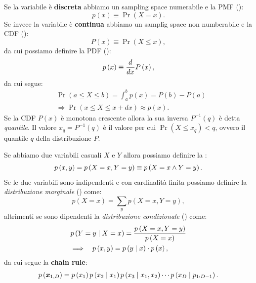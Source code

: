 \documentclass[10pt]{article}
\DeclareMathOperator{\pr}{Pr}
\newcommand{\pare}[1]{
	\ensuremath{\left(#1\right)}
}
\begin{document}
Se la variabile è \textbf{discreta} abbiamo un sampling space numerabile e la PMF ():
\begin{equation}
p\pare{x} \equiv \pr\pare{X = x}.
\end{equation}
Se invece la variabile è \textbf{continua} abbiamo un samplig space non numberabile e la CDF ():
\begin{equation}
P\pare{x} \equiv \pr\pare{X \leq x},
\end{equation}
da cui possiamo definire la PDF ():
\begin{equation}
p\pare{x} \equiv \deriv{}{x}P\pare{x},
\end{equation}
da cui segue:
\begin{align}
&\pr\pare{a \leq X \leq b} = \int_a^b p\pare{x} = P\pare{b} - P\pare{a} \\
&\Longrightarrow \pr\pare{x \leq X \leq x + dx} \approx p\pare{x}.
\end{align}
Se la CDF $P\pare{x}$ è monotona crescente allora la sua inversa $P^{-1}(q)$ è
detta \textit{quantile}. Il valore $x_q = P^{-1}\pare{q}$ è il valore per cui
$\pr\pare{X\leq x_q} < q$, ovvero il quantile $q$ della distribuzione $P$.

Se abbiamo due variabili casuali $X$ e $Y$ allora possiamo definire la :
\begin{equation}
p\pare{x, y} = p\pare{X = x, Y = y} \equiv p\pare{X = x\et Y = y}.
\end{equation}
Se le due variabili sono indipendenti e con cardinalità finita possiamo definire la \textit{distribuzione marginale} () come:
\begin{equation}
p\pare{X = x} = \sum_y p\pare{X=x, Y=y},
\end{equation}
altrimenti se sono dipendenti la \textit{distribuzione condizionale} () come:
\begin{equation}
\begin{split}
&p\pare{Y=y\cond X=x} = \frac{p\pare{X=x, Y=y}}{p\pare{X=x}} \\
&\Longrightarrow\quad p\pare{x, y} = p\pare{y\cond x}\cdot p\pare{x},
\end{split}
\end{equation}
da cui segue la \textbf{chain rule}:
\begin{equation}
p\pare{\ve{x}_{1,D}} = p\pare{x_1} p\pare{x_2\cond x_1} p\pare{x_3\cond x_1, x_2}\cdots p\pare{x_D\cond p_{1: D-1}}.
\end{equation}
\end{document}
